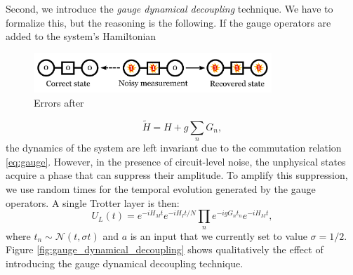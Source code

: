 \documentclass[a4paper]{article}
\begin{document}
Second, we introduce the \textit{gauge dynamical decoupling} technique. We have to formalize this, but the reasoning is the following. If the gauge operators are added to the system's Hamiltonian

\begin{figure}
    \centering
    \includegraphics[width=0.8\textwidth]{bad_recovery_scheme.pdf}
    \caption{Errors after }
\end{figure}
%
\begin{equation}
     \tilde{H} = H + g \sum_n G_n,
     \label{eq:hamiltonian_gauge}
 \end{equation}
%
the dynamics of the system are left invariant due to the commutation relation \eqref{eq:gauge}. However, in the presence of circuit-level noise, the unphysical states acquire a phase that can suppress their amplitude. To amplify this suppression, we use random times for the temporal evolution generated by the gauge operators. A single Trotter layer is then:
%
\begin{equation}
    U_L(t) = e^{-i H_M t} e^{-i H_I t/N} \prod_{n} e^{-i g G_n t_n} e^{-i H_M t},
\end{equation}
%
where $t_n \sim \mathcal{N}(t, \sigma t)$ and $a$ is an input that we currently set to value $\sigma = 1/2$. Figure \ref{fig:gauge_dynamical_decoupling} shows qualitatively the effect of introducing the gauge dynamical decoupling technique.
\end{document}
